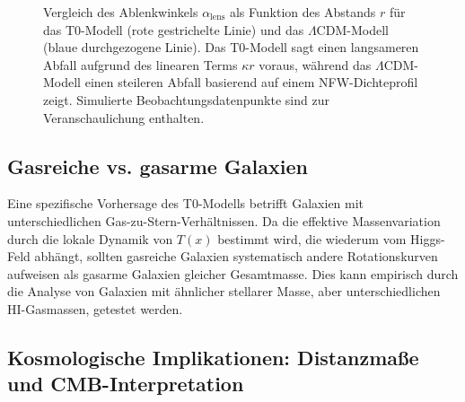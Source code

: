 \documentclass[a4paper,12pt]{article}
\newcommand{\Tfield}{T(x)}
\begin{document}
	\begin{figure}[h]
		\centering
		\caption{Vergleich des Ablenkwinkels \( \alpha_{\text{lens}} \) als Funktion des Abstands \( r \) für das T0-Modell (rote gestrichelte Linie) und das \( \Lambda \)CDM-Modell (blaue durchgezogene Linie). Das T0-Modell sagt einen langsameren Abfall aufgrund des linearen Terms \( \kappa r \) voraus, während das \( \Lambda \)CDM-Modell einen steileren Abfall basierend auf einem NFW-Dichteprofil zeigt. Simulierte Beobachtungsdatenpunkte sind zur Veranschaulichung enthalten.}
		\label{fig:lensing-profile}
	\end{figure}
	
	\subsection{Gasreiche vs. gasarme Galaxien}
	
	Eine spezifische Vorhersage des T0-Modells betrifft Galaxien mit unterschiedlichen Gas-zu-Stern-Verhältnissen. Da die effektive Massenvariation durch die lokale Dynamik von \( \Tfield \) bestimmt wird, die wiederum vom Higgs-Feld abhängt, sollten gasreiche Galaxien systematisch andere Rotationskurven aufweisen als gasarme Galaxien gleicher Gesamtmasse. Dies kann empirisch durch die Analyse von Galaxien mit ähnlicher stellarer Masse, aber unterschiedlichen HI-Gasmassen, getestet werden.
	
	\subsection{Kosmologische Implikationen: Distanzmaße und CMB-Interpretation}
	
\end{document}

